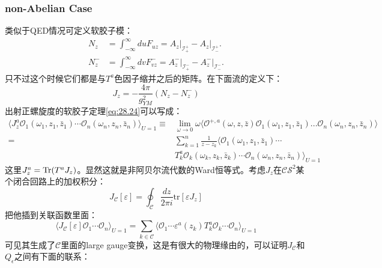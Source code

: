 \subsubsection{non-Abelian Case}
类似于QED情况可定义软胶子模：
\begin{equation}
	\begin{aligned}N_z&=\int_{-\infty}^\infty duF_{uz}=A_z\big|_{\mathcal{I}_+^+}-A_z\big|_{\mathcal{I}_-^+}.\\N_z^-&=\int_{-\infty}^\infty dvF_{vz}^-=A_z^-\big|_{\mathcal{I}_+^-}-A_z^-\big|_{\mathcal{I}_-^-}.\end{aligned}
\end{equation}
只不过这个时候它们都是与$T^a$色因子缩并之后的矩阵。在下面流的定义下：
\begin{equation}
	J_z=-\frac{4\pi}{g_{YM}^2}\left(N_z-N_z^-\right)
\end{equation}
出射正螺旋度的软胶子定理\ref{eq:28.24}可以写成：
\begin{equation}
	\begin{aligned}\langle J_z^a\mathcal{O}_1(\omega_1,z_1,\bar{z}_1)\cdots\mathcal{O}_n(\omega_n,z_n,\bar{z}_n)\rangle_{U=1}\equiv &
		\lim_{\omega\to0}\omega\langle\mathcal{O}^{+,a}(\omega,z,\bar{z})\mathcal{O}_1(\omega_1,z_1,\bar{z}_1)...\mathcal{O}_n(\omega_n,z_n,\bar{z}_n)\rangle \\=&\sum_{k=1}^n\frac{1}{z-z_k}\langle\mathcal{O}_1(\omega_1,z_1,\bar{z}_1)\cdots\\&T_k^a\mathcal{O}_k(\omega_k,z_k,\bar{z}_k)\cdots\mathcal{O}_n(\omega_n,z_n,\bar{z}_n)\rangle_{U=1}\end{aligned}
\end{equation}
这里$J^a_z=\Tr(T^aJ_z)$。显然这就是非阿贝尔流代数的Ward恒等式。考虑$J_z$在$\mathcal{CS}^2$某个闭合回路上的加权积分：
\begin{equation}
	J_{\mathcal{C}}[\varepsilon]=\oint_{\mathcal{C}}\frac{dz}{2\pi i}\mathrm{tr}\left[\varepsilon J_z\right]
\end{equation}
把他插到关联函数里面：
\begin{equation}\label{51.44}
	\langle\left.J_{\mathcal{C}}[\varepsilon]\mathcal{O}_1\cdots\mathcal{O}_n\right.\rangle_{U=1}=\sum_{k\in\mathcal{C}}\langle\left.\mathcal{O}_1\cdots\varepsilon^a(z_k)T_k^a\mathcal{O}_k\cdots\mathcal{O}_n\right.\rangle_{U=1}
\end{equation}
可见其生成了$\mathcal{C}$里面的large gauge变换，这是有很大的物理缘由的，可以证明$J_{\mathcal{C}}$和$Q_\epsilon$之间有下面的联系：
